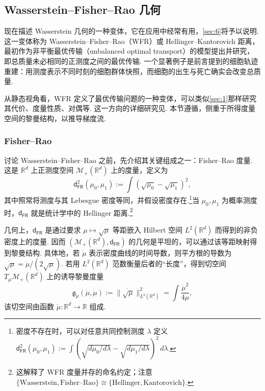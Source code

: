 \subsection{Wasserstein--Fisher--Rao 几何}\label{sec:5.7}

现在描述 Wasserstein 几何的一种变体，它在应用中经常有用，\autoref{sec:6}将予以说明. 这一变体称为 Wasserstein--Fisher--Rao（WFR）或 Hellinger--Kantorovich 距离，最初作为非平衡最优传输（unbalanced optimal transport）的模型提出并研究，即总质量未必相同的正测度之间的最优传输. 一个显著例子是前言提到的细胞轨迹重建：用测度表示不同时刻的细胞群体快照，而细胞的出生与死亡确实会改变总质量.

从静态视角看，WFR 定义了最优传输问题的一种变体，可以类似\autoref{sec:1}那样研究其代价、度量性质、对偶等. 这一方向的详细研究见\cite{ref84,ref183,ref209,ref210}. 本节遵循\cite[附录 H]{ref192}，侧重于所得度量空间的黎曼结构，以推导梯度流.

\subsubsection*{Fisher--Rao}
讨论 Wasserstein--Fisher--Rao 之前，先介绍其关键组成之一：Fisher--Rao 度量. 这是 $\mathbb R^d$ 上正测度空间 $\mathcal M_+(\mathbb R^d)$ 上的度量，定义为
$$
\mathsf d_{\mathsf{FR}}^2(\mu_0,\mu_1):=\int(\sqrt{\mu_0}-\sqrt{\mu_1})^2,
$$
其中照常将测度与其 Lebesgue 密度等同，并假设密度存在.\footnote{密度不存在时，可以对任意共同控制测度 $\lambda$ 定义 $\mathsf d_{\mathsf{FR}}^2(\mu_0,\mu_1):=\int(\sqrt{d\mu_0/d\lambda}-\sqrt{d\mu_1/d\lambda})^2\,d\lambda$.}当 $\mu_0,\mu_1$ 为概率测度时，$\mathsf d_{\mathsf{FR}}$ 就是统计学中的 Hellinger 距离.\footnote{这解释了 WFR 度量并存的命名约定；注意 $\{\text{Wasserstein},\text{Fisher--Rao}\}\cong\{\text{Hellinger},\text{Kantorovich}\}$.}

几何上，$\mathsf d_{\mathsf{FR}}$ 是通过要求 $\mu\mapsto\sqrt\mu$ 等距嵌入 Hilbert 空间 $L^2(\mathbb R^d)$ 而得到的非负密度上的度量. 因而 $(\mathcal M_+(\mathbb R^d),\mathsf d_{\mathsf{FR}})$ 的几何是平坦的，可以通过该等距映射得到黎曼结构. 具体地，若 $\dot\mu$ 表示密度曲线的时间导数，则平方根的导数为 $\dot{\sqrt\mu}=\dot\mu/(2\sqrt\mu)$. 若用 $L^2(\mathbb R^d)$ 范数衡量后者的“长度”，得到切空间 $T_\mu\mathcal M_+(\mathbb R^d)$ 上的诱导黎曼度量
$$
\mathfrak g_\mu(\dot\mu,\dot\mu)
:=\|\dot{\sqrt\mu}\|_{L^2(\mathbb R^d)}^2=\int\frac{\dot\mu^2}{4\mu},
$$
该切空间由函数 $\dot\mu:\mathbb R^d\to\mathbb R$ 组成.

